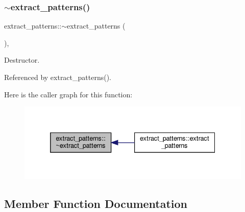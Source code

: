 \subsubsection{\texorpdfstring{$\sim$extract\+\_\+patterns()}{~extract\_patterns()}}
{\footnotesize\ttfamily extract\+\_\+patterns\+::$\sim$extract\+\_\+patterns (\begin{DoxyParamCaption}{ }\end{DoxyParamCaption})\hspace{0.3cm}{\ttfamily [override]}, {\ttfamily [default]}}



Destructor. 



Referenced by extract\+\_\+patterns().

Here is the caller graph for this function\+:
\nopagebreak
\begin{figure}[H]
\begin{center}
\leavevmode
\includegraphics[width=332pt]{d6/db8/classextract__patterns_a5c2193772858461b9749c3d151c7ae5f_icgraph}
\end{center}
\end{figure}


\subsection{Member Function Documentation}
\mbox{\label{classextract__patterns_aab3d5e503044febc2718e02322cb01ef}} 
